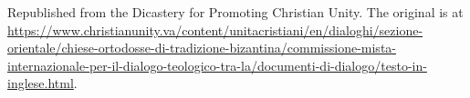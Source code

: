 \documentclass[11pt,letterpaper]{article}
\begin{document}
\color{ink}



\vspace{2em}
{\small\noindent Republished from the Dicastery for Promoting Christian Unity. The
original is at
\url{https://www.christianunity.va/content/unitacristiani/en/dialoghi/sezione-orientale/chiese-ortodosse-di-tradizione-bizantina/commissione-mista-internazionale-per-il-dialogo-teologico-tra-la/documenti-di-dialogo/testo-in-inglese.html}.\par}
\end{document}
